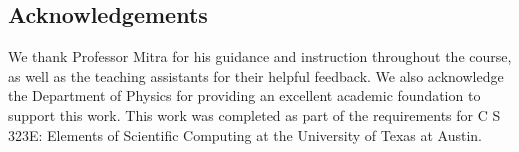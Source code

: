 \documentclass[linenumbers, twocolumn]{aastex631}
\begin{document}
\subsection{Acknowledgements}
We thank Professor Mitra for his guidance and instruction throughout the course,
as well as the teaching assistants for their helpful feedback. We also
acknowledge the Department of Physics for providing an excellent academic foundation 
to support this work. This work was completed as part of the requirements for 
C S 323E: Elements of Scientific Computing at the University of Texas at Austin.

\newpage


\end{document}
